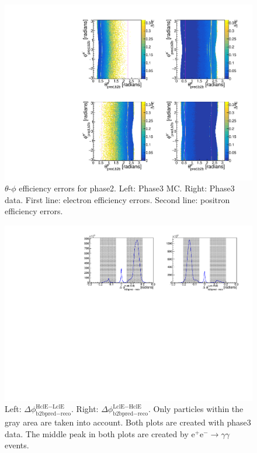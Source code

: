 \documentclass[a4paper,11pt,twosided,final,german,openbib,pdftex,listof=totoc,bibliography=totoc]{scrbook}
\begin{document}
\begin{appendix}
\begin{figure}[!htbp]
	\centering
	\includegraphics[width=\textwidth]{Plots/master3/xCEffTP_MCData_ErrorP3.pdf}
	\caption[$\theta$-$\phi$ Efficiency Error Plots Phase3]{$\theta$-$\phi$ efficiency errors for phase2. Left: Phase3 MC. Right: Phase3 data. First line: electron efficiency errors. Second line: positron efficiency errors.}
	\label{plt:xCEff_ErrorP3}
\end{figure}



\begin{figure}[h!]
	\centering
	\includegraphics[width=\textwidth]{Plots/master3/hb2b_DataP3.pdf}
	\caption[b2bClusterPhi - clusterPhi For Phase3 Data]{Left: $\Delta \phi _{\textrm{b2bpred} - \textrm{reco}}^{\textrm{HclE}-\textrm{LclE}}$. Right:  $\Delta \phi _{\textrm{b2bpred} - \textrm{reco}}^{\textrm{LclE}-\textrm{HclE}}$. Only particles within the gray area are taken into account. Both plots are created with phase3 data. The middle peak in both plots are created by $\textrm{e}^+\textrm{e}^- \rightarrow \gamma \gamma$ events.}
	\label{fig:b2bData3}
\end{figure}





\end{appendix}
\end{document}
